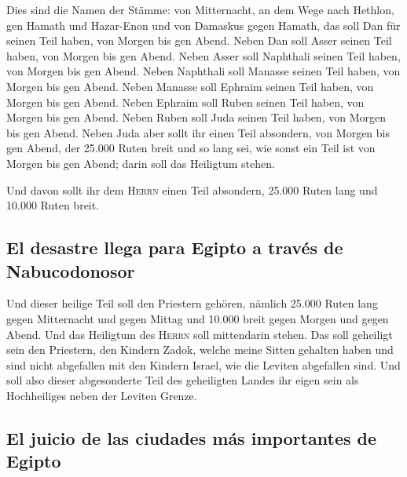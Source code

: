  Dies sind die Namen der Stämme: von Mitternacht, an dem
Wege nach Hethlon, gen Hamath und Hazar-Enon und von Damaskus gegen
Hamath, das soll Dan für seinen Teil haben, von Morgen bis gen Abend.
 Neben Dan soll Asser seinen Teil haben, von Morgen bis
gen Abend.  Neben Asser soll Naphthali seinen Teil haben,
von Morgen bis gen Abend.  Neben Naphthali soll Manasse
seinen Teil haben, von Morgen bis gen Abend.  Neben
Manasse soll Ephraim seinen Teil haben, von Morgen bis gen Abend.
 Neben Ephraim soll Ruben seinen Teil haben, von Morgen
bis gen Abend.  Neben Ruben soll Juda seinen Teil haben,
von Morgen bis gen Abend.  Neben Juda aber sollt ihr einen
Teil absondern, von Morgen bis gen Abend, der 25.000 Ruten breit und so
lang sei, wie sonst ein Teil ist von Morgen bis gen Abend; darin soll
das Heiligtum stehen.

 Und davon sollt ihr dem \textsc{Herrn} einen Teil
absondern, 25.000 Ruten lang und 10.000 Ruten breit.

\hypertarget{el-desastre-llega-para-egipto-a-travuxe9s-de-nabucodonosor}{%
\subsection{El desastre llega para Egipto a través de
Nabucodonosor}\label{el-desastre-llega-para-egipto-a-travuxe9s-de-nabucodonosor}}

 Und dieser heilige Teil soll den Priestern gehören,
nämlich 25.000 Ruten lang gegen Mitternacht und gegen Mittag und 10.000
breit gegen Morgen und gegen Abend. Und das Heiligtum des \textsc{Herrn}
soll mittendarin stehen.  Das soll geheiligt sein den
Priestern, den Kindern Zadok, welche meine Sitten gehalten haben und
sind nicht abgefallen mit den Kindern Israel, wie die Leviten abgefallen
sind.  Und soll also dieser abgesonderte Teil des
geheiligten Landes ihr eigen sein als Hochheiliges neben der Leviten
Grenze.

\hypertarget{el-juicio-de-las-ciudades-muxe1s-importantes-de-egipto}{%
\subsection{El juicio de las ciudades más importantes de
Egipto}\label{el-juicio-de-las-ciudades-muxe1s-importantes-de-egipto}}

